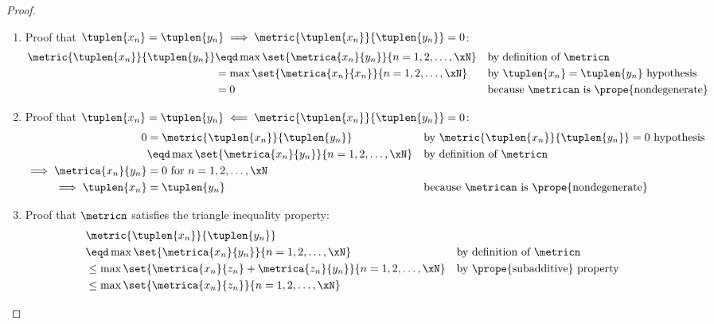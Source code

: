 \begin{proof}
\begin{enumerate}
\begin{enumerate}
  \item Proof that $\tuplen{x_n}=\tuplen{y_n}\implies\metric{\tuplen{x_n}}{\tuplen{y_n}}=0$:
    \begin{align*}
      \metric{\tuplen{x_n}}{\tuplen{y_n}}
        &\eqd \max\set{\metrica{x_n}{y_n}}{n=1,2,\ldots,\xN}
        &&    \text{by definition of $\metricn$}
      \\&=    \max\set{\metrica{x_n}{x_n}}{n=1,2,\ldots,\xN}
        &&    \text{by $\tuplen{x_n}=\tuplen{y_n}$ hypothesis}
      \\&=    0
        &&    \text{because $\metrican$ is \prope{nondegenerate}}
      \\
    \end{align*}
  \item Proof that $\tuplen{x_n}=\tuplen{y_n}\impliedby\metric{\tuplen{x_n}}{\tuplen{y_n}}=0$:
    \begin{align*}
      0
        &=    \metric{\tuplen{x_n}}{\tuplen{y_n}}
        &&    \text{by $\metric{\tuplen{x_n}}{\tuplen{y_n}}=0$ hypothesis}
      \\&\eqd \max\set{\metrica{x_n}{y_n}}{n=1,2,\ldots,\xN}
        &&    \text{by definition of $\metricn$}
      \\\implies \metrica{x_n}{y_n}&=0 \text{ for } n=1,2,\ldots,\xN
      \\\implies \tuplen{x_n}&=\tuplen{y_n}
        &&    \text{because $\metrican$ is \prope{nondegenerate}}
      \\
    \end{align*}
  \item Proof that $\metricn$ satisfies the triangle inequality property:
    \begin{align*}
      &\metric{\tuplen{x_n}}{\tuplen{y_n}}
      \\&\eqd \max\set{\metrica{x_n}{y_n}}{n=1,2,\ldots,\xN}
        &&    \text{by definition of $\metricn$}
      \\&\le  \max\set{\metrica{x_n}{z_n}+\metrica{z_n}{y_n}}{n=1,2,\ldots,\xN}
        &&    \text{by \prope{subadditive} property}
      \\&\le  \max\set{\metrica{x_n}{z_n}}{n=1,2,\ldots,\xN}

\end{align*}
\end{enumerate}
\end{enumerate}
\end{proof}
